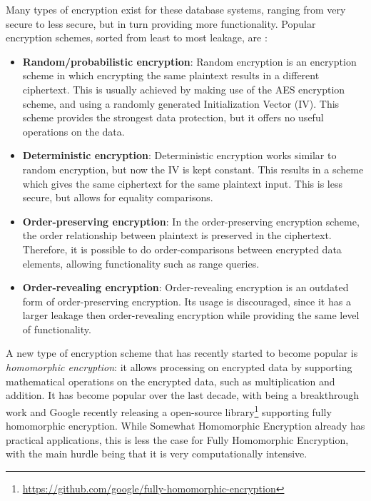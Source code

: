 Many types of encryption exist for these database systems, ranging from very secure to less secure, but in turn providing more functionality. Popular encryption schemes, sorted from least to most leakage, are \citep{cryptdice}:
\begin{itemize}
    \item \textbf{Random/probabilistic encryption}: Random encryption is an encryption scheme in which encrypting the same plaintext results in a different ciphertext. This is usually achieved by making use of the AES encryption scheme, and using a randomly generated Initialization Vector (IV). This scheme provides the strongest data protection, but it offers no useful operations on the data.
    \item \textbf{Deterministic encryption}: Deterministic encryption works similar to random encryption, but now the IV is kept constant. This results in a scheme which gives the same ciphertext for the same plaintext input. This is less secure, but allows for equality comparisons.
    \item \textbf{Order-preserving encryption}: In the order-preserving encryption scheme, the order relationship between plaintext is preserved in the ciphertext. Therefore, it is possible to do order-comparisons between encrypted data elements, allowing functionality such as range queries.
    \item \textbf{Order-revealing encryption}: Order-revealing encryption is an outdated form of order-preserving encryption. Its usage is discouraged, since it has a larger leakage then order-revealing encryption while providing the same level of functionality. 
\end{itemize}
A new type of encryption scheme that has recently started to become popular is \textit{homomorphic encryption}: it allows processing on encrypted data by supporting mathematical operations on the encrypted data, such as multiplication and addition. It has become popular over the last decade, with \citet{fhe} being a breakthrough work and Google recently releasing a open-source library\footnote{\url{https://github.com/google/fully-homomorphic-encryption}} supporting fully homomorphic encryption. While Somewhat Homomorphic Encryption already has practical applications, this is less the case for Fully Homomorphic Encryption, with the main hurdle being that it is very computationally intensive.
